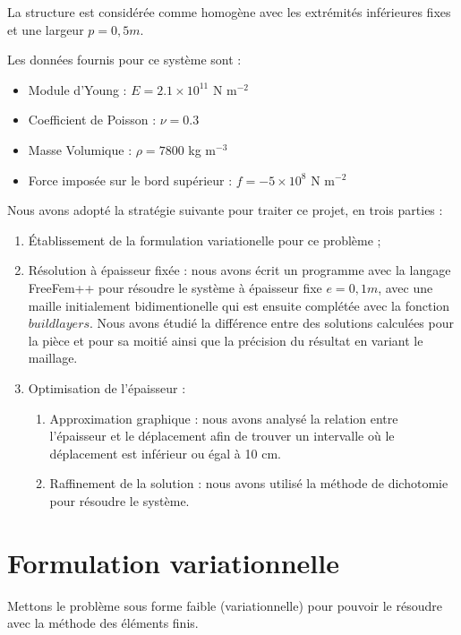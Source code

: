 \documentclass{article}
\begin{document}
    La structure est considérée comme homogène avec les extrémités inférieures fixes et une largeur $p = 0,5 m$. 
    
    Les données fournis pour ce système sont :
    
    \begin{itemize}
    \item Module d'Young : $E = 2.1 \times 10^11$ N m$^{-2}$
    \item Coefficient de Poisson : $\nu = 0.3$ 
    \item Masse Volumique : $\rho = 7800$ kg m$^{-3}$
    \item Force imposée sur le bord supérieur : $f= - 5 \times 10^8$ N m$^{-2}$
    \end{itemize}
    
    Nous avons adopté la stratégie suivante pour traiter ce projet, en trois parties :
    \begin{enumerate}
        \item Établissement de la formulation variationelle pour ce problème ;
        \item Résolution à épaisseur fixée : nous avons écrit un programme avec la langage FreeFem++ pour résoudre le système à épaisseur fixe $e = 0,1 m$, 
            avec une maille initialement bidimentionelle qui est ensuite complétée avec la fonction $buildlayers$. 
            Nous avons étudié la différence entre des solutions calculées pour la pièce et pour sa moitié ainsi que la précision du résultat en variant le maillage.
        \item Optimisation de l'épaisseur :
        \begin{enumerate}
            \item Approximation graphique : 
                nous avons analysé la relation entre l'épaisseur et le déplacement afin de trouver un intervalle où le déplacement est inférieur ou égal à 10 cm.
            \item Raffinement de la solution : nous avons utilisé la méthode de dichotomie pour résoudre le système.
        \end{enumerate}
    \end{enumerate}

    \newpage
    
    \section{Formulation variationnelle}

    \begin{problem}{1}
    Mettons le problème sous forme faible (variationnelle) pour pouvoir le résoudre avec la méthode des éléments finis.
    \end{problem}
    
\end{document}
